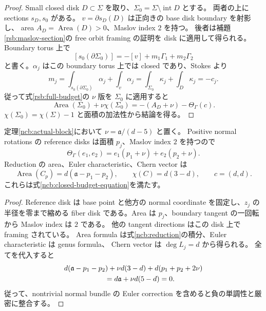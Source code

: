 \begin{proof}
Small closed disk $D\subset\Sigma$ を取り、$\Sigma_0=\Sigma\setminus\operatorname{int}D$ とする。
両者の上に sections $s_D,s_0$ がある。
$v=\partial s_D(D)$ は正向きの base disk boundary を射影し、
area $A_D=\operatorname{Area}(D)>0$、Maslov index $2$ を持つ。
後者は補題\ref{rsb:maslov-section}の free orbit framing の証明を disk に適用して得られる。
Boundary torus 上で
\[
 [s_0(\partial\Sigma_0)]=-[v]+m_1\Gamma_1+m_2\Gamma_2
\]
と書く。$\alpha_j$ はこの boundary torus 上では closed であり、Stokes より
\[
 m_j
 =\int_{s_0(\partial\Sigma_0)}\alpha_j+\int_v\alpha_j
 =\int_{\Sigma_0}\kappa_j+\int_D\kappa_j
 =-c_j.
\]
従って式\eqref{rsb:full-budget}の $\nu$ 版を $\Sigma_0$ に適用すると
\[
 \operatorname{Area}(\Sigma_0)+\nu\chi(\Sigma_0)
 =-(A_D+\nu)-\Theta_\Gamma(c).
\]
$\chi(\Sigma_0)=\chi(\Sigma)-1$ と面積の加法性から結論を得る。
\end{proof}

\begin{corollary}\label{ncb:normal-budget}
定理\ref{ncb:actual-block}において $\nu=\mathfrak a/(d-5)$ と置く。
Positive normal rotations の reference disks は面積 $p_j$、Maslov index $2$ を持つので
\begin{equation}\label{ncb:normal-theta}
 \Theta_\Gamma(e_1,e_2)=e_1(p_1+\nu)+e_2(p_2+\nu).
\end{equation}
Reduction の area、Euler characteristic、Chern vector は
\begin{equation}\label{ncb:normal-numbers}
 \operatorname{Area}(C_p)=d(\mathfrak a-p_1-p_2),\qquad
 \chi(C)=d(3-d),\qquad c=(d,d).
\end{equation}
これらは式\eqref{ncb:closed-budget-equation}を満たす。
\end{corollary}

\begin{proof}
Reference disk は base point と他方の normal coordinate を固定し、$z_j$ の半径を零まで縮める
fiber disk である。Area は $p_j$、boundary tangent の一回転から Maslov index は $2$ である。
他の tangent directions はこの disk 上で framing されている。
Area formula は式\eqref{ncb:reduction}の積分、Euler characteristic は genus formula、
Chern vector は $\deg L_j=d$ から得られる。
全てを代入すると
\[
 \begin{split}
 &d(\mathfrak a-p_1-p_2)+\nu d(3-d)
       +d(p_1+p_2+2\nu)\\
 &\hspace{20mm}=d\mathfrak a+\nu d(5-d)=0.
 \end{split}
\]
従って、nontrivial normal bundle の Euler correction を含めると負の単調性と厳密に整合する。
\end{proof}

